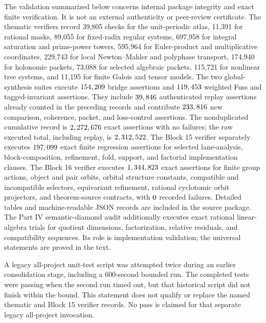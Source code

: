 \documentclass[11pt]{article}
\theoremstyle{definition}
\theoremstyle{remark}
\begin{document}
The validation summarized below concerns internal package integrity and exact finite verification. It is not an external authenticity or peer-review certificate. The thematic verifiers record 39,805 checks for the unit-periodic atlas, 11,391 for rational masks, 89,055 for fixed-radix regular systems, 697,958 for integral saturation and prime-power towers, 595,964 for Euler-product and multiplicative coordinates, 229,743 for local Newton--Mahler and polyphase transport, 174,940 for holonomic packets, 73,088 for selected algebraic packets, 115,721 for nonlinear tree systems, and 11,195 for finite Galois and tensor models. The two global-synthesis suites execute \(154,209\) bridge assertions and \(119,453\) weighted Fuss and tagged-invariant assertions. They include \(39,846\) authenticated replay assertions already counted in the preceding records and contribute \(233,816\) new comparison, coherence, packet, and loss-control assertions. The nonduplicated cumulative record is \(2,272,676\) exact assertions with no failures; the raw executed total, including replay, is \(2,312,522\). The Block 15 verifier separately executes \(197,099\) exact finite regression assertions for selected lane-analysis, block-composition, refinement, fold, support, and factorial implementation clauses. The Block 16 verifier executes \(1,344,823\) exact assertions for finite group actions, object and pair orbits, orbital structure constants, compatible and incompatible selectors, equivariant refinement, rational cyclotomic orbit projectors, and theorem-source contracts, with \(0\) recorded failures. Detailed tables and machine-readable JSON records are included in the source package. The Part IV semantic-diamond audit additionally executes exact rational linear-algebra trials for quotient dimensions, factorization, relative residuals, and compatibility sequences. Its role is implementation validation; the universal statements are proved in the text.





A legacy all-project unit-test script was attempted twice during an earlier consolidation stage, including a 600-second bounded run. The completed tests were passing when the second run timed out, but that historical script did not finish within the bound. This statement does not qualify or replace the named thematic and Block 15 verifier records. No pass is claimed for that separate legacy all-project invocation.
\end{document}

